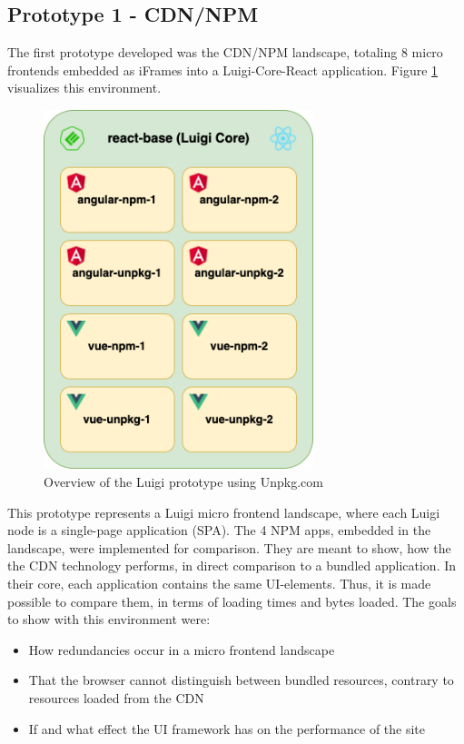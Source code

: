 \subsection{Prototype 1 - CDN/NPM}

The first prototype developed was the CDN/NPM landscape, totaling 8 micro frontends embedded as iFrames into a Luigi-Core-React application.
Figure \ref{fig:unpkg_prototype_architecture} visualizes this environment.
 
\begin{figure}[!h]
	\centering
	\includegraphics[width=0.7\textwidth]{Figures/unpkg.architecture.drawio.png}
	\caption{Overview of the Luigi prototype using Unpkg.com}
	\label{fig:unpkg_prototype_architecture}
\end{figure}

This prototype represents a Luigi micro frontend landscape, where each Luigi node is a single-page application (SPA). 
The 4 NPM apps, embedded in the landscape, were implemented for comparison. They are meant to show, how the the CDN technology performs, in direct comparison to a bundled application.
In their core, each application contains the same UI-elements. Thus, it is made possible to compare them, in terms of loading times and bytes loaded.
The goals to show with this environment were:

\begin{itemize}
	\item How redundancies occur in a micro frontend landscape
	\item That the browser cannot distinguish between bundled resources, contrary to resources loaded from the CDN
	\item If and what effect the UI framework has on the performance of the site
\end{itemize}

